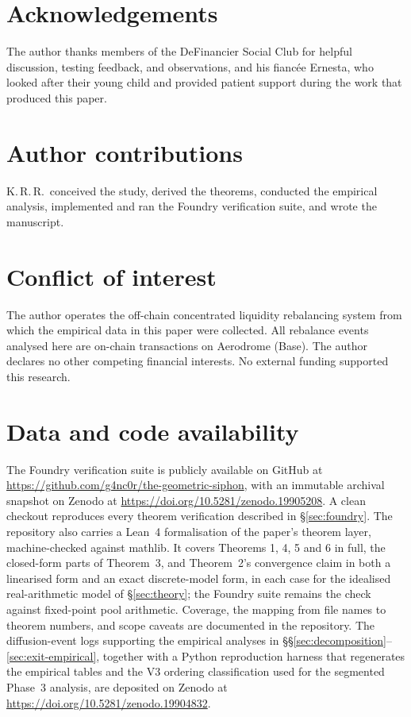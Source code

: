 \documentclass[11pt,a4paper]{article}
\theoremstyle{plain}
\begin{document}
\section*{Acknowledgements}

The author thanks members of the DeFinancier Social Club for helpful discussion, testing feedback, and observations, and his fianc\'ee Ernesta, who looked after their young child and provided patient support during the work that produced this paper.

\section*{Author contributions}

K.\,R.\,R.\ conceived the study, derived the theorems, conducted the empirical analysis, implemented and ran the Foundry verification suite, and wrote the manuscript.

\section*{Conflict of interest}

The author operates the off-chain concentrated liquidity rebalancing system from which the empirical data in this paper were collected. All rebalance events analysed here are on-chain transactions on Aerodrome (Base). The author declares no other competing financial interests. No external funding supported this research.

\section*{Data and code availability}

The Foundry verification suite is publicly available on GitHub at \url{https://github.com/g4nc0r/the-geometric-siphon}, with an immutable archival snapshot on Zenodo at \url{https://doi.org/10.5281/zenodo.19905208}. A clean checkout reproduces every theorem verification described in \S\ref{sec:foundry}. The repository also carries a Lean~4 formalisation of the paper's theorem layer, machine-checked against mathlib. It covers Theorems 1, 4, 5 and 6 in full, the closed-form parts of Theorem~3, and Theorem~2's convergence claim in both a linearised form and an exact discrete-model form, in each case for the idealised real-arithmetic model of \S\ref{sec:theory}; the Foundry suite remains the check against fixed-point pool arithmetic. Coverage, the mapping from file names to theorem numbers, and scope caveats are documented in the repository. The diffusion-event logs supporting the empirical analyses in \S\S\ref{sec:decomposition}--\ref{sec:exit-empirical}, together with a Python reproduction harness that regenerates the empirical tables and the V3 ordering classification used for the segmented Phase~3 analysis, are deposited on Zenodo at \url{https://doi.org/10.5281/zenodo.19904832}.
\end{document}
